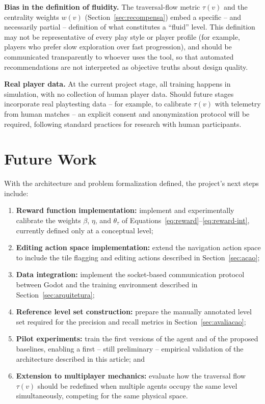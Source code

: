 \documentclass[sigconf,nonacm,language=english]{acmart}
\begin{document}
\textbf{Bias in the definition of fluidity.} The traversal-flow metric
$\tau(v)$ and the centrality weights $w(v)$ (Section~\ref{sec:recompensa})
embed a specific -- and necessarily partial -- definition of what
constitutes a ``fluid'' level. This definition may not be representative of
every play style or player profile (for example, players who prefer slow
exploration over fast progression), and should be communicated
transparently to whoever uses the tool, so that automated recommendations
are not interpreted as objective truths about design quality.

\textbf{Real player data.} At the current project stage, all training
happens in simulation, with no collection of human player data. Should
future stages incorporate real playtesting data -- for example, to
calibrate $\tau(v)$ with telemetry from human matches -- an explicit
consent and anonymization protocol will be required, following standard
practices for research with human participants.

\section{Future Work}
\label{sec:futuro}

With the architecture and problem formalization defined, the project's
next steps include:
\begin{enumerate}
  \item \textbf{Reward function implementation:} implement and
    experimentally calibrate the weights $\beta$, $\eta$, and $\theta_\tau$
    of Equations~\eqref{eq:reward}--\eqref{eq:reward-int}, currently
    defined only at a conceptual level;
  \item \textbf{Editing action space implementation:} extend the
    navigation action space to include the tile flagging and editing
    actions described in Section~\ref{sec:acao};
  \item \textbf{Data integration:} implement the socket-based communication
    protocol between Godot and the training environment described in
    Section~\ref{sec:arquitetura};
  \item \textbf{Reference level set construction:} prepare the manually
    annotated level set required for the precision and recall metrics in
    Section~\ref{sec:avaliacao};
  \item \textbf{Pilot experiments:} train the first versions of the agent
    and of the proposed baselines, enabling a first -- still preliminary --
    empirical validation of the architecture described in this article; and
  \item \textbf{Extension to multiplayer mechanics:} evaluate how the
    traversal flow $\tau(v)$ should be redefined when multiple agents
    occupy the same level simultaneously, competing for the same physical
    space.
\end{enumerate}
\end{document}
